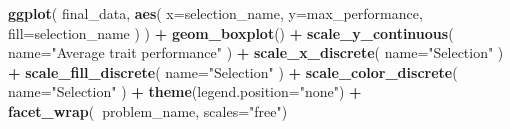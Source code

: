 \documentclass[]{book}
\newenvironment{Shaded}{\begin{snugshade}}{\end{snugshade}}
\newcommand{\CommentTok}[1]{\textcolor[rgb]{0.56,0.35,0.01}{\textit{#1}}}
\newcommand{\DataTypeTok}[1]{\textcolor[rgb]{0.13,0.29,0.53}{#1}}
\newcommand{\DecValTok}[1]{\textcolor[rgb]{0.00,0.00,0.81}{#1}}
\newcommand{\KeywordTok}[1]{\textcolor[rgb]{0.13,0.29,0.53}{\textbf{#1}}}
\newcommand{\NormalTok}[1]{#1}
\newcommand{\OperatorTok}[1]{\textcolor[rgb]{0.81,0.36,0.00}{\textbf{#1}}}
\newcommand{\StringTok}[1]{\textcolor[rgb]{0.31,0.60,0.02}{#1}}
\begin{document}
\begin{Shaded}
\end{Shaded}

\begin{Shaded}
\begin{Highlighting}[]
\KeywordTok{ggplot}\NormalTok{(}
\NormalTok{    final_data,}
    \KeywordTok{aes}\NormalTok{(}
      \DataTypeTok{x=}\NormalTok{selection_name,}
      \DataTypeTok{y=}\NormalTok{max_performance,}
      \DataTypeTok{fill=}\NormalTok{selection_name}
\NormalTok{    )}
\NormalTok{  ) }\OperatorTok{+}
\StringTok{  }\KeywordTok{geom_boxplot}\NormalTok{() }\OperatorTok{+}
\StringTok{  }\KeywordTok{scale_y_continuous}\NormalTok{(}
    \DataTypeTok{name=}\StringTok{"Average trait performance"}
\NormalTok{  ) }\OperatorTok{+}
\StringTok{  }\KeywordTok{scale_x_discrete}\NormalTok{(}
    \DataTypeTok{name=}\StringTok{"Selection"}
\NormalTok{  ) }\OperatorTok{+}
\StringTok{  }\KeywordTok{scale_fill_discrete}\NormalTok{(}
    \DataTypeTok{name=}\StringTok{"Selection"}
\NormalTok{  ) }\OperatorTok{+}
\StringTok{  }\KeywordTok{scale_color_discrete}\NormalTok{(}
    \DataTypeTok{name=}\StringTok{"Selection"}
\NormalTok{  ) }\OperatorTok{+}\StringTok{ }
\StringTok{  }\KeywordTok{theme}\NormalTok{(}\DataTypeTok{legend.position=}\StringTok{"none"}\NormalTok{) }\OperatorTok{+}
\StringTok{  }\KeywordTok{facet_wrap}\NormalTok{(}\OperatorTok{~}\NormalTok{problem_name, }\DataTypeTok{scales=}\StringTok{"free"}\NormalTok{)}
\end{Highlighting}
\end{Shaded}
\end{document}
